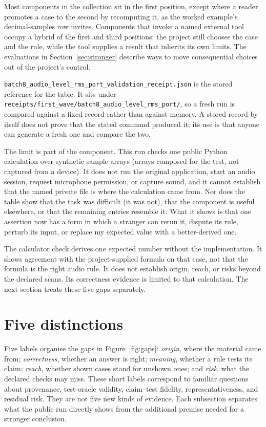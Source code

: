 \documentclass[11pt]{article}
\newcommand{\component}[1]{\nolinkurl{#1}}
\begin{document}
Most components in the collection sit in the first position, except where
a reader promotes a case to the second by recomputing it, as the worked
example's decimal-samples row invites. Components that invoke a named
external tool occupy a hybrid of the first and third positions: the project
still chooses the case and the rule, while the tool supplies a result that
inherits its own limits. The evaluations in Section~\ref{sec:stronger} describe
ways to move consequential choices out of the project's control.

\component{batch8_audio_level_rms_port_validation_receipt.json} is the stored
reference for the table. It sits under
\component{receipts/first_wave/batch8_audio_level_rms_port/}, so a fresh run is
compared against a fixed record rather than against memory. A stored record by
itself does not prove that the stated command produced it; its use is that
anyone can generate a fresh one and compare the two.

The limit is part of the component. This run checks one public Python
calculation over synthetic sample arrays (arrays composed for the test, not
captured from a device). It does not run the original application, start an
audio session, request microphone permission, or capture sound, and it
cannot establish that the named private file is where the calculation came
from. Nor does the table show that the task was difficult (it was not),
that the component is useful elsewhere, or that the remaining entries
resemble it. What it shows is that one assertion now has a form in which a
stranger can rerun it, dispute its rule, perturb its input, or replace my
expected value with a better-derived one.

The calculator check derives one expected number without the implementation.
It shows agreement with the project-supplied formula on that case, not that
the formula is the right audio rule. It does not establish origin, reach, or
risks beyond the declared scans. Its correctness evidence is limited to that
calculation. The next section treats these five gaps separately.

\section{Five distinctions}
\label{sec:distinctions}

Five labels organise the gaps in Figure~\ref{fig:gaps}: \emph{origin}, where
the material came from; \emph{correctness}, whether an answer is right;
\emph{meaning}, whether a rule tests its claim; \emph{reach}, whether shown
cases stand for unshown ones; and \emph{risk}, what the declared checks may
miss. These short labels correspond to familiar questions about provenance,
test-oracle validity, claim--test fidelity, representativeness, and residual
risk. They are not five new kinds of evidence. Each subsection separates what
the public run directly shows from the additional premise needed for a stronger
conclusion.
\end{document}
